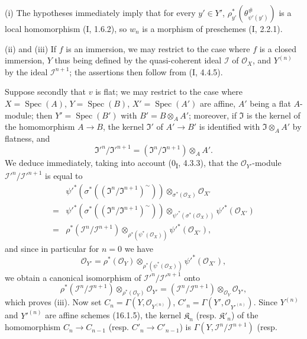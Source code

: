 \noindent(i) The hypotheses immediately imply that for every $y'\in Y'$,
$\rho_{y'}^*(\theta_{\psi'(y')}^\#)$ is a local homomorphism (I, 1.6.2),
so $w_n$ is a morphism of preschemes (I, 2.2.1).

\noindent(ii) and (iii) If $f$ is an immersion, we may restrict to the case where
$f$ is a closed immersion, $Y$ thus being defined by the quasi-coherent
ideal $\mathscr{I}$ of $\mathcal{O}_X$, and $Y^{(n)}$ by the ideal
$\mathscr{I}^{n+1}$; the assertions then follow from (I, 4.4.5).

Suppose secondly that $v$ is flat; we may restrict to the case where
$X=\operatorname{Spec}(A)$, $Y=\operatorname{Spec}(B)$,
$X'=\operatorname{Spec}(A')$ are affine, $A'$ being a flat $A$-module;
then $Y'=\operatorname{Spec}(B')$ with $B'=B\otimes_A A'$; moreover, if
$\mathfrak{I}$ is the kernel of the homomorphism $A\to B$, the kernel
$\mathfrak{I}'$ of $A'\to B'$ is identified with $\mathfrak{I}\otimes_A A'$ by
flatness, and
\[
  \mathfrak{I}'^n/\mathfrak{I}'^{n+1}
  =(\mathfrak{I}^n/\mathfrak{I}^{n+1})\otimes_A A'.
\]
We deduce immediately, taking into account (0\textsubscript{I}, 4.3.3), that the
$\mathcal{O}_{Y'}$-module
$\mathscr{I}'^n/\mathscr{I}'^{n+1}$ is equal to
\begin{align*}
&\psi'^*\!\left(\sigma^*
  \left((\mathfrak{I}^n/\mathfrak{I}^{n+1})^{\sim}\right)\right)
  \otimes_{\sigma^*(\mathcal{O}_X)}\mathcal{O}_{X'} \\
={}&
\psi'^*\!\left(\sigma^*
  \left((\mathfrak{I}^n/\mathfrak{I}^{n+1})^{\sim}\right)\right)
  \otimes_{\psi'^*(\sigma^*(\mathcal{O}_X))}
  \psi'^*(\mathcal{O}_{X'}) \\
={}&
\rho^*(\mathscr{I}^n/\mathscr{I}^{n+1})
  \otimes_{\rho^*(\psi^*(\mathcal{O}_X))}
  \psi'^*(\mathcal{O}_{X'}),
\end{align*}
and since in particular for $n=0$ we have
\[
  \mathcal{O}_{Y'}=
  \rho^*(\mathcal{O}_Y)
  \otimes_{\rho^*(\psi^*(\mathcal{O}_X))}
  \psi'^*(\mathcal{O}_{X'}),
\]
we obtain a canonical isomorphism of
$\mathscr{I}'^n/\mathscr{I}'^{n+1}$ onto
\[
  \rho^*(\mathscr{I}^n/\mathscr{I}^{n+1})
  \otimes_{\rho^*(\mathcal{O}_Y)}\mathcal{O}_{Y'}
  =
  (\mathscr{I}^n/\mathscr{I}^{n+1})
  \otimes_{\mathcal{O}_Y}\mathcal{O}_{Y'},
\]
which proves (iii). Now set
$C_n=\Gamma(Y,\mathcal{O}_{Y^{(n)}})$,
$C'_n=\Gamma(Y',\mathcal{O}_{Y'^{(n)}})$. Since $Y^{(n)}$ and
$Y'^{(n)}$ are affine schemes (16.1.5), the kernel
$\mathfrak{K}_n$ (resp. $\mathfrak{K}'_n$) of the homomorphism
$C_n\to C_{n-1}$ (resp. $C'_n\to C'_{n-1}$) is
$\Gamma(Y,\mathscr{I}^n/\mathscr{I}^{n+1})$ (resp.
